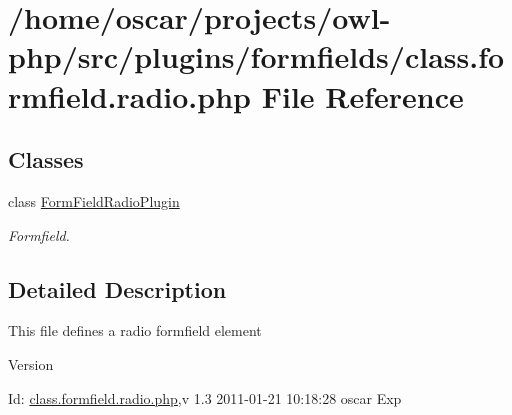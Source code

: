 \section{/home/oscar/projects/owl-\/php/src/plugins/formfields/class.formfield.radio.php File Reference}
\label{class_8formfield_8radio_8php}
\subsection*{Classes}
\begin{DoxyCompactItemize}
\item 
class \hyperlink{classFormFieldRadioPlugin}{FormFieldRadioPlugin}
\begin{DoxyCompactList}\small\item\em Formfield. \item\end{DoxyCompactList}\end{DoxyCompactItemize}


\subsection{Detailed Description}
This file defines a radio formfield element \begin{DoxyVersion}{Version}

\end{DoxyVersion}
\begin{DoxyParagraph}{Id:}
\hyperlink{class_8formfield_8radio_8php}{class.formfield.radio.php},v 1.3 2011-\/01-\/21 10:18:28 oscar Exp 
\end{DoxyParagraph}
